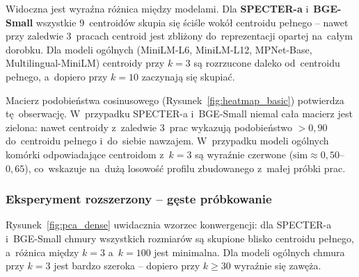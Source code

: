 Widoczna jest wyraźna różnica między modelami.
Dla \textbf{SPECTER-a} i~\textbf{BGE-Small} wszystkie 9~centroidów
skupia się ściśle wokół centroidu pełnego -- nawet przy zaledwie
3~pracach centroid jest zbliżony do~reprezentacji opartej na~całym dorobku.
Dla modeli ogólnych (MiniLM-L6, MiniLM-L12, MPNet-Base,
Multilingual-MiniLM) centroidy przy $k=3$ są rozrzucone daleko
od~centroidu pełnego, a~dopiero przy $k=10$ zaczynają się skupiać.


Macierz podobieństwa cosinusowego (Rysunek~\ref{fig:heatmap_basic})
potwierdza tę~obserwację.
W~przypadku SPECTER-a i~BGE-Small niemal cała macierz jest zielona:
nawet centroidy z~zaledwie 3~prac wykazują podobieństwo $> 0{,}90$
do~centroidu pełnego i~do~siebie nawzajem.
W~przypadku modeli ogólnych komórki odpowiadające centroidom z~$k=3$
są wyraźnie czerwone ($\mathrm{sim} \approx 0{,}50$--$0{,}65$),
co~wskazuje na~dużą losowość profilu zbudowanego z~małej próbki prac.

\subsubsection{Eksperyment rozszerzony -- gęste próbkowanie}



Rysunek~\ref{fig:pca_dense} uwidacznia wzorzec konwergencji:
dla SPECTER-a i~BGE-Small chmury wszystkich rozmiarów są skupione
blisko centroidu pełnego, a~różnica między $k=3$ a~$k=100$ jest minimalna.
Dla modeli ogólnych chmura przy $k=3$ jest bardzo szeroka --
dopiero przy $k \geq 30$ wyraźnie się zawęża.

